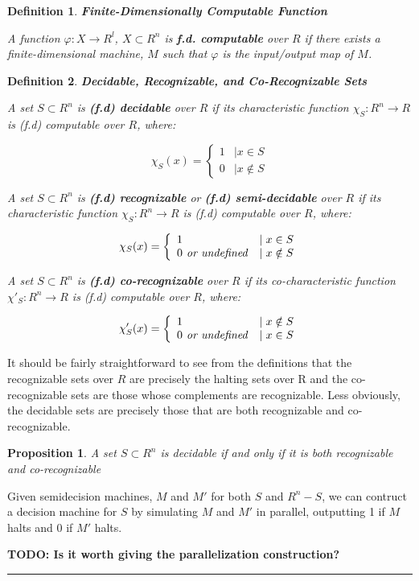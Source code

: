\documentclass[twoside]{article}
\newcommand{\todo}[1]{
  \LARGE
  \textbf{TODO: #1}
  \normalsize
}
\newcommand{\twopartdef}[4]
{
  \left\{
    \begin{array}{ll}
      #1 & \mid #2 \\
      #3 & \mid #4
    \end{array}
  \right.
}
\newcommand{\functype}[3]{$#1:#2 \rightarrow #3$}
\newtheorem{proposition}{Proposition}[section]
\newtheorem{definition}{Definition}[section]
\newenvironment{proofsketch}{{\bf Proof Sketch:}}{\hfill\rule{2mm}{2mm}}
\begin{document}
\begin{definition}{\textbf{Finite-Dimensionally Computable Function}}
  
  A function \functype{\varphi}{X}{R^l}, $X \subset R^n$ is
  \textbf{f.d. computable} over $R$ if there exists a
  finite-dimensional machine, $M$ such that $\varphi$ is the
  input/output map of $M$.
  
\end{definition}

\begin{definition}{\textbf{Decidable, Recognizable, and Co-Recognizable Sets}}
  
  A set $S \subset R^n$ is \textbf{(f.d) decidable} over $R$ if its
  characteristic function \functype{\chi_S}{R^n}{R} is (f.d)
  computable over $R$, where:
  
  $$\chi_S(x) =  \twopartdef{1}{x \in S}{0}{x \notin S}$$
  
  A set $S \subset R^n$ is \textbf{(f.d) recognizable} or
  \textbf{(f.d) semi-decidable} over $R$ if its characteristic
  function \functype{\chi_S}{R^n}{R} is (f.d) computable over $R$,
  where:
  
  $$\chi_S(x) =  \twopartdef{1}{x \in S}{0 \text{\emph{ or undefined}}}{x \notin S}$$
  
  A set $S \subset R^n$ is \textbf{(f.d) co-recognizable} over $R$
  if its co-characteristic function \functype{\chi'_S}{R^n}{R} is (f.d)
  computable over $R$, where:
  
  $$\chi'_S(x) =  \twopartdef{1}{x \notin S}{0 \text{\emph{ or undefined}}}{x \in S}$$
  
\end{definition}

  It should be fairly straightforward to see from the
  definitions that the recognizable sets over $R$ are precisely the
  halting sets over R and the co-recognizable sets are those whose
  complements are recognizable. Less obviously, the decidable sets
  are precisely those that are both recognizable and co-recognizable.

\begin{proposition}{A set $S \subset R^n$ is decidable if and only if it is
  both recognizable and co-recognizable}
\end{proposition}
\begin{proofsketch}
  
  Given semidecision machines, $M$ and $M'$ for both $S$ and $R^n -
  S$, we can contruct a decision machine for $S$ by simulating $M$ and
  $M'$ in parallel, outputting 1 if $M$ halts and 0 if $M'$ halts.  

  \todo{Is it worth giving the parallelization construction?}

\end{proofsketch}
\end{document}
